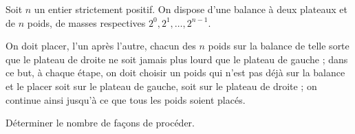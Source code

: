 Soit $n$ un entier strictement positif. On dispose d'une balance à deux plateaux et de $n$ poids, de masses
respectives $2^0, 2^1, \ldots, 2^{n-1}$.

On doit placer, l'un après l'autre, chacun des $n$ poids sur la balance de telle sorte que le plateau de
droite ne soit jamais plus lourd que le plateau de gauche ; dans ce but, à chaque étape, on doit choisir un
poids qui n'est pas déjà sur la balance et le placer soit sur le plateau de gauche, soit sur le plateau de
droite ; on continue ainsi jusqu'à ce que tous les poids soient placés.

Déterminer le nombre de façons de procéder.
